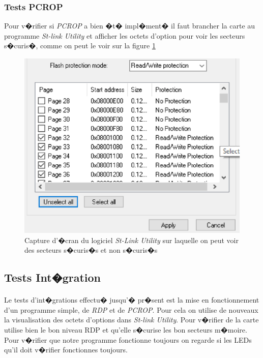 \documentclass[a4paper, titlepage,12pt]{report}
\begin{document}
\subsubsection{Tests PCROP}
Pour v�rifier si \textit{PCROP} a bien �t� impl�ment� il faut brancher la carte au programme \textit{St-link Utility} et afficher les octets d'option pour voir les secteurs s�curis�, comme on peut le voir sur la figure \ref{SecuSecteur}  
 
\begin{figure}[!h]
\centering
\includegraphics[scale=0.6]{img/eps/PCROPVerif.eps}
\caption{Capture d'�cran du logiciel \textit{St-Link Utility} sur laquelle on peut voir des secteurs s�curis�s et non s�curis�s }
\label{SecuSecteur}
\end{figure}
\pagebreak

\subsection{Tests Int�gration}
\paragraph{}
Le tests d'int�grations effectu� jusqu'� pr�sent est la mise en fonctionnement d'un programme simple, de \textit{RDP} et de \textit{PCROP}. Pour cela on utilise de nouveaux la visualisation des octets d'options dans \textit{St-link Utility}. Pour v�rifier de la carte utilise bien le bon niveau RDP et qu'elle s�curise les bon secteurs m�moire. Pour v�rifier que notre programme fonctionne toujours on regarde si les LEDs qu'il doit v�rifier fonctionnes toujours.
\end{document}
